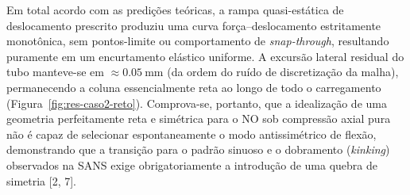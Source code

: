 \documentclass[12pt,a4paper]{article}
\begin{document}
Em total acordo com as predições teóricas, a rampa quasi-estática de deslocamento prescrito produziu uma curva força--deslocamento estritamente monotônica, sem pontos-limite ou comportamento de \emph{snap-through}, resultando puramente em um encurtamento elástico uniforme. A excursão lateral residual do tubo manteve-se em $\approx \SI{0.05}{\milli\meter}$ (da ordem do ruído de discretização da malha), permanecendo a coluna essencialmente reta ao longo de todo o carregamento (Figura~\ref{fig:res-caso2-reto}). Comprova-se, portanto, que a idealização de uma geometria perfeitamente reta e simétrica para o NO sob compressão axial pura não é capaz de selecionar espontaneamente o modo antissimétrico de flexão, demonstrando que a transição para o padrão sinuoso e o dobramento (\emph{kinking}) observados na SANS exige obrigatoriamente a introdução de uma quebra de simetria [2, 7].
\end{document}
